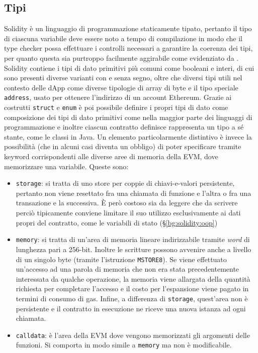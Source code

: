 \documentclass[12pt,a4paper,openright,oneside]{report}
\theoremstyle{definition}
\begin{document}
\subsection{Tipi}\label{bg:solidity:types}
Solidity \`{e} un linguaggio di programmazione staticamente tipato, pertanto il tipo di ciascuna variabile deve essere noto a tempo di compilazione in modo che il type checker possa effettuare i controlli necessari a garantire la coerenza dei tipi, per quanto questa sia purtroppo facilmente aggirabile come evidenziato da \cite{solidity_type_error1,solidity_type_error2}. Solidity contiene i tipi di dato primitivi pi\`{u} comuni come booleani e interi, di cui sono presenti diverse varianti con e senza segno, oltre che diversi tipi utili nel contesto delle dApp come diverse tipologie di array di byte e il tipo speciale \texttt{address}, usato per ottenere l'indirizzo di un account Ethereum. Grazie ai costrutti \texttt{struct} e \texttt{enum} \`{e} poi possibile definire i propri tipi di dato come composizione dei tipi di dato primitivi come nella maggior parte dei linguaggi di programmazione e inoltre ciascun contratto definisce rappresenta un tipo a s\'{e} stante, come le classi in Java. Un elemento particolarmente distintivo \`{e} invece la possibilit\`{a} (che in alcuni casi diventa un obbligo) di poter specificare tramite keyword corrispondenti alle diverse aree di memoria della EVM, dove memorizzare una variabile. Queste sono:
\begin{itemize}
    \item \texttt{storage}: si tratta di uno store per coppie di chiavi-e-valori persistente, pertanto non viene resettato fra una chiamata di funzione e l'altra o fra una transazione e la successiva. \`{E} per\`{o} costoso sia da leggere che da scrivere perci\`{o} tipicamente conviene limitare il suo utilizzo esclusivamente ai dati propri del contratto, come le variabili di stato (\S\ref{bg:solidity:oop})
    \item \texttt{memory}: si tratta di un'area di memoria lineare indirizzabile tramite \textit{word} di lunghezza pari a 256-bit. Inoltre le scritture possono avvenire anche a livello di un singolo byte (tramite l'istruzione \texttt{MSTORE8}). Se viene effettuato un'accesso ad una parola di memoria che non era stata precedentemente interessata da qualche operazione, la memoria viene allargata della quantit\`{a} richiesta per completare l'accesso e il costo per l'espansione viene pagato in termini di consumo di gas. Infine, a differenza di \texttt{storage}, quest'area non \`{e} persistente e il contratto in esecuzione ne riceve una nuova istanza ad ogni chiamata.
    \item \texttt{calldata}: \`{e} l'area della EVM dove vengono memorizzati gli argomenti delle funzioni. Si comporta in modo simile a \texttt{memory} ma non \`{e} modificabile.
\end{itemize}
\end{document}
